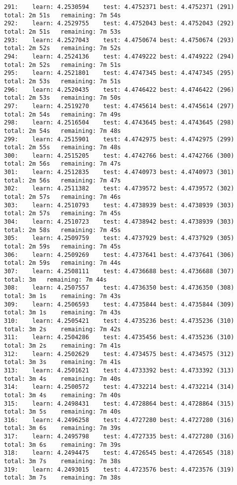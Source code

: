 \documentclass[11pt]{article}
\begin{document}
\begin{Verbatim}[commandchars=\\\{\}]
291:	learn: 4.2530594	test: 4.4752371	best: 4.4752371 (291)	total: 2m 51s	remaining: 7m 54s
292:	learn: 4.2529755	test: 4.4752043	best: 4.4752043 (292)	total: 2m 51s	remaining: 7m 53s
293:	learn: 4.2527043	test: 4.4750674	best: 4.4750674 (293)	total: 2m 52s	remaining: 7m 52s
294:	learn: 4.2524136	test: 4.4749222	best: 4.4749222 (294)	total: 2m 52s	remaining: 7m 51s
295:	learn: 4.2521801	test: 4.4747345	best: 4.4747345 (295)	total: 2m 53s	remaining: 7m 51s
296:	learn: 4.2520435	test: 4.4746422	best: 4.4746422 (296)	total: 2m 53s	remaining: 7m 50s
297:	learn: 4.2519270	test: 4.4745614	best: 4.4745614 (297)	total: 2m 54s	remaining: 7m 49s
298:	learn: 4.2516504	test: 4.4743645	best: 4.4743645 (298)	total: 2m 54s	remaining: 7m 48s
299:	learn: 4.2515901	test: 4.4742975	best: 4.4742975 (299)	total: 2m 55s	remaining: 7m 48s
300:	learn: 4.2515205	test: 4.4742766	best: 4.4742766 (300)	total: 2m 56s	remaining: 7m 47s
301:	learn: 4.2512835	test: 4.4740973	best: 4.4740973 (301)	total: 2m 56s	remaining: 7m 47s
302:	learn: 4.2511382	test: 4.4739572	best: 4.4739572 (302)	total: 2m 57s	remaining: 7m 46s
303:	learn: 4.2510793	test: 4.4738939	best: 4.4738939 (303)	total: 2m 57s	remaining: 7m 45s
304:	learn: 4.2510723	test: 4.4738942	best: 4.4738939 (303)	total: 2m 58s	remaining: 7m 45s
305:	learn: 4.2509759	test: 4.4737929	best: 4.4737929 (305)	total: 2m 59s	remaining: 7m 45s
306:	learn: 4.2509269	test: 4.4737641	best: 4.4737641 (306)	total: 2m 59s	remaining: 7m 44s
307:	learn: 4.2508111	test: 4.4736688	best: 4.4736688 (307)	total: 3m	remaining: 7m 44s
308:	learn: 4.2507557	test: 4.4736350	best: 4.4736350 (308)	total: 3m 1s	remaining: 7m 43s
309:	learn: 4.2506593	test: 4.4735844	best: 4.4735844 (309)	total: 3m 1s	remaining: 7m 43s
310:	learn: 4.2505421	test: 4.4735236	best: 4.4735236 (310)	total: 3m 2s	remaining: 7m 42s
311:	learn: 4.2504286	test: 4.4735456	best: 4.4735236 (310)	total: 3m 2s	remaining: 7m 41s
312:	learn: 4.2502629	test: 4.4734575	best: 4.4734575 (312)	total: 3m 3s	remaining: 7m 41s
313:	learn: 4.2501621	test: 4.4733392	best: 4.4733392 (313)	total: 3m 4s	remaining: 7m 40s
314:	learn: 4.2500572	test: 4.4732214	best: 4.4732214 (314)	total: 3m 4s	remaining: 7m 40s
315:	learn: 4.2498431	test: 4.4728864	best: 4.4728864 (315)	total: 3m 5s	remaining: 7m 40s
316:	learn: 4.2496258	test: 4.4727280	best: 4.4727280 (316)	total: 3m 6s	remaining: 7m 39s
317:	learn: 4.2495798	test: 4.4727335	best: 4.4727280 (316)	total: 3m 6s	remaining: 7m 39s
318:	learn: 4.2494475	test: 4.4726545	best: 4.4726545 (318)	total: 3m 7s	remaining: 7m 38s
319:	learn: 4.2493015	test: 4.4723576	best: 4.4723576 (319)	total: 3m 7s	remaining: 7m 38s

\end{Verbatim}
\end{document}
